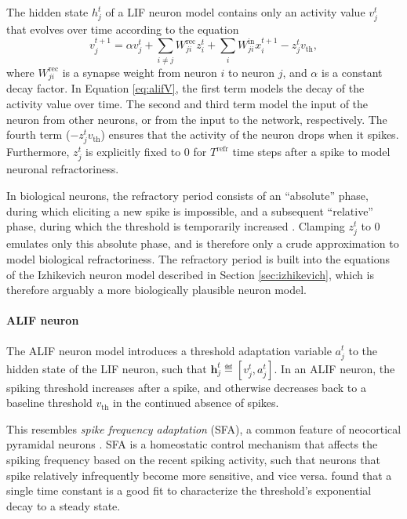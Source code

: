             The hidden state $h^t_j$ of a LIF neuron model contains only an activity value $v^t_j$ that evolves over time according to the equation
            \begin{equation}\label{eq:alifV}
            v^{t+1}_j = \alpha v_j^t + \sum_{i\neq j}W^\text{rec}_{ji}z_i^t + \sum_i W^\text{in}_{ji}x_i^{t+1} - z_j^tv_
            \text{th},
            \end{equation}
            where $W^\text{rec}_{ji}$ is a synapse weight from neuron $i$ to neuron $j$, and $\alpha$ is a constant decay factor.
            In Equation \ref{eq:alifV}, the first term models the decay of the activity value over time.
            The second and third term model the input of the neuron from other neurons, or from the input to the network, respectively.
            The fourth term ($-z^t_jv_\text{th}$) ensures that the activity of the neuron drops when it spikes.
            Furthermore, $z^t_j$ is explicitly fixed to 0 for $T^\text{refr}$ time steps after a spike to model neuronal refractoriness.

            In biological neurons, the refractory period consists of an ``absolute'' phase, during which eliciting a new spike is impossible, and a subsequent ``relative'' phase, during which the threshold is temporarily increased \citep{purves2008neuroscience}.
            Clamping $z^t_j$ to 0 emulates only this absolute phase, and is therefore only a crude approximation to model biological refractoriness.
            The refractory period is built into the equations of the Izhikevich neuron model described in Section \ref{sec:izhikevich}, which is therefore arguably a more biologically plausible neuron model.


        \paragraph{ALIF neuron}
            The ALIF neuron model introduces a threshold adaptation variable $a^t_j$ to the hidden state of the LIF neuron, such that $\mathbf{h}^t_j \eqdef \left[v^t_j, a^t_j\right]$.
            In an ALIF neuron, the spiking threshold increases after a spike, and otherwise decreases back to a baseline threshold $v_\text{th}$ in the continued absence of spikes.

            This resembles \emph{spike frequency adaptation} (SFA), a common feature of neocortical pyramidal neurons \citep{benda2003universal}.
            SFA is a homeostatic control mechanism that affects the spiking frequency based on the recent spiking activity, such that neurons that spike relatively infrequently become more sensitive, and vice versa.
            \citet{ahmed1998estimates} found that a single time constant is a good fit to characterize the threshold's exponential decay to a steady state.

